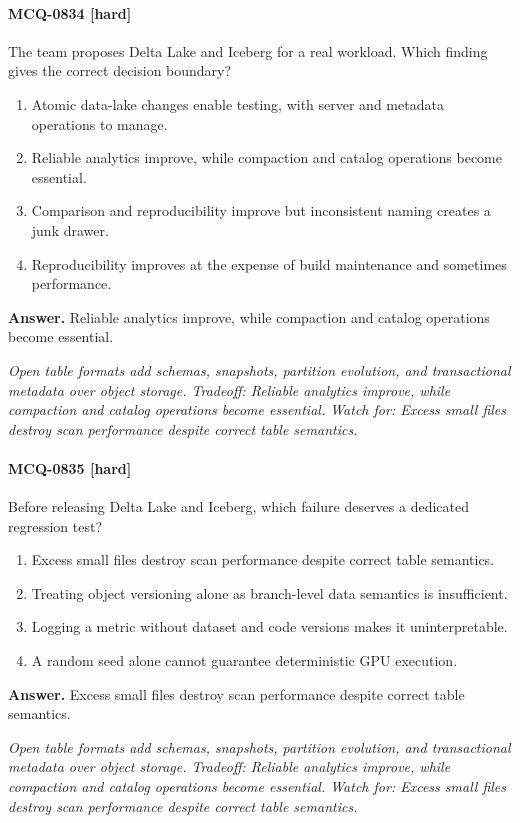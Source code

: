 \paragraph{MCQ-0834 [hard]} The team proposes Delta Lake and Iceberg for a real workload. Which finding gives the correct decision boundary?
\begin{enumerate}[label=\Alph*.]
\item Atomic data-lake changes enable testing, with server and metadata operations to manage.
\item Reliable analytics improve, while compaction and catalog operations become essential.
\item Comparison and reproducibility improve but inconsistent naming creates a junk drawer.
\item Reproducibility improves at the expense of build maintenance and sometimes performance.
\end{enumerate}
\noindent\textbf{Answer.} Reliable analytics improve, while compaction and catalog operations become essential.
\par\textit{Open table formats add schemas, snapshots, partition evolution, and transactional metadata over object storage. Tradeoff: Reliable analytics improve, while compaction and catalog operations become essential. Watch for: Excess small files destroy scan performance despite correct table semantics.}
\paragraph{MCQ-0835 [hard]} Before releasing Delta Lake and Iceberg, which failure deserves a dedicated regression test?
\begin{enumerate}[label=\Alph*.]
\item Excess small files destroy scan performance despite correct table semantics.
\item Treating object versioning alone as branch-level data semantics is insufficient.
\item Logging a metric without dataset and code versions makes it uninterpretable.
\item A random seed alone cannot guarantee deterministic GPU execution.
\end{enumerate}
\noindent\textbf{Answer.} Excess small files destroy scan performance despite correct table semantics.
\par\textit{Open table formats add schemas, snapshots, partition evolution, and transactional metadata over object storage. Tradeoff: Reliable analytics improve, while compaction and catalog operations become essential. Watch for: Excess small files destroy scan performance despite correct table semantics.}
